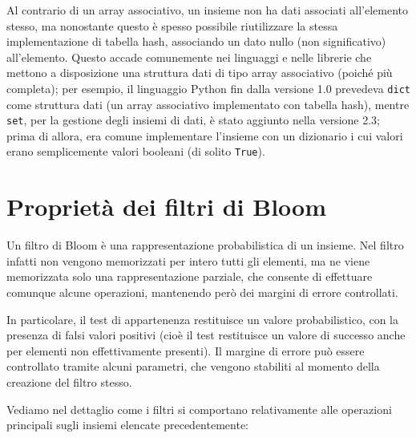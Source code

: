 Al contrario di un array associativo, un insieme non ha dati associati all'elemento stesso, ma
nonostante questo è spesso possibile riutilizzare la stessa implementazione di tabella hash,
associando un dato nullo (non significativo) all'elemento. Questo accade comunemente nei linguaggi e
nelle librerie che mettono a disposizione una struttura dati di tipo array associativo (poiché più
completa); per esempio, il linguaggio Python fin dalla versione 1.0 prevedeva \verb|dict| come
struttura dati (un array associativo implementato con tabella hash), mentre \verb|set|, per la
gestione degli insiemi di dati, è stato aggiunto nella versione 2.3; prima di allora, era comune
implementare l'insieme con un dizionario i cui valori erano semplicemente valori booleani (di solito
\verb|True|).

\section{Proprietà dei filtri di Bloom}

Un filtro di Bloom \cite{bloomfilters} è una rappresentazione probabilistica di un insieme. Nel
filtro infatti non vengono memorizzati per intero tutti gli elementi, ma ne viene memorizzata solo
una rappresentazione parziale, che consente di effettuare comunque alcune operazioni, mantenendo
però dei margini di errore controllati.

In particolare, il test di appartenenza restituisce un valore probabilistico, con la presenza di
falsi valori positivi (cioè il test restituisce un valore di successo anche per elementi non
effettivamente presenti). Il margine di errore può essere controllato tramite alcuni parametri, che
vengono stabiliti al momento della creazione del filtro stesso.

Vediamo nel dettaglio come i filtri si comportano relativamente alle operazioni principali sugli
insiemi elencate precedentemente:

